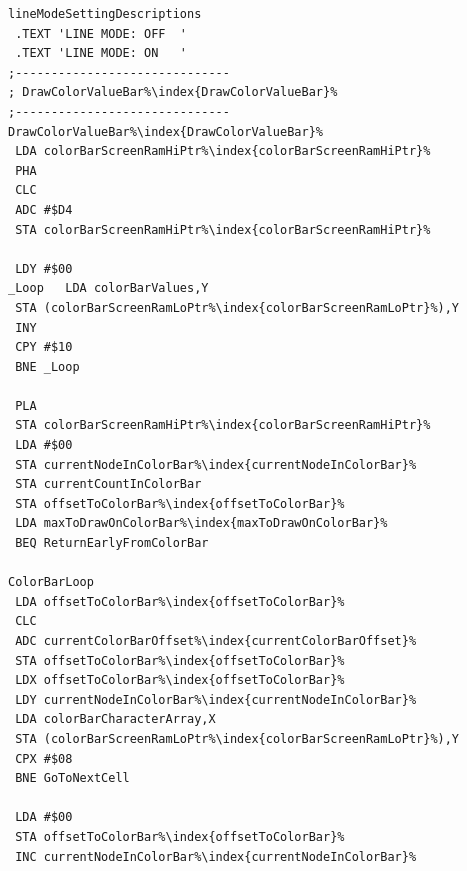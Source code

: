 \begin{minipage}[b]{0.33\linewidth}
\begin{lrbox}{\mybox}
\begin{lstlisting}[basicstyle=\ttfamily\tiny,escapechar=\%]
lineModeSettingDescriptions
 .TEXT 'LINE MODE: OFF  '
 .TEXT 'LINE MODE: ON   '
;------------------------------
; DrawColorValueBar%\index{DrawColorValueBar}%
;------------------------------
DrawColorValueBar%\index{DrawColorValueBar}%
 LDA colorBarScreenRamHiPtr%\index{colorBarScreenRamHiPtr}%
 PHA
 CLC
 ADC #$D4
 STA colorBarScreenRamHiPtr%\index{colorBarScreenRamHiPtr}%

 LDY #$00
_Loop   LDA colorBarValues,Y
 STA (colorBarScreenRamLoPtr%\index{colorBarScreenRamLoPtr}%),Y
 INY
 CPY #$10
 BNE _Loop

 PLA
 STA colorBarScreenRamHiPtr%\index{colorBarScreenRamHiPtr}%
 LDA #$00
 STA currentNodeInColorBar%\index{currentNodeInColorBar}%
 STA currentCountInColorBar
 STA offsetToColorBar%\index{offsetToColorBar}%
 LDA maxToDrawOnColorBar%\index{maxToDrawOnColorBar}%
 BEQ ReturnEarlyFromColorBar

ColorBarLoop
 LDA offsetToColorBar%\index{offsetToColorBar}%
 CLC
 ADC currentColorBarOffset%\index{currentColorBarOffset}%
 STA offsetToColorBar%\index{offsetToColorBar}%
 LDX offsetToColorBar%\index{offsetToColorBar}%
 LDY currentNodeInColorBar%\index{currentNodeInColorBar}%
 LDA colorBarCharacterArray,X
 STA (colorBarScreenRamLoPtr%\index{colorBarScreenRamLoPtr}%),Y
 CPX #$08
 BNE GoToNextCell

 LDA #$00
 STA offsetToColorBar%\index{offsetToColorBar}%
 INC currentNodeInColorBar%\index{currentNodeInColorBar}%

\end{lstlisting}
\end{lrbox}%
\scalebox{0.8}{\usebox{\mybox}}
\end{minipage}
